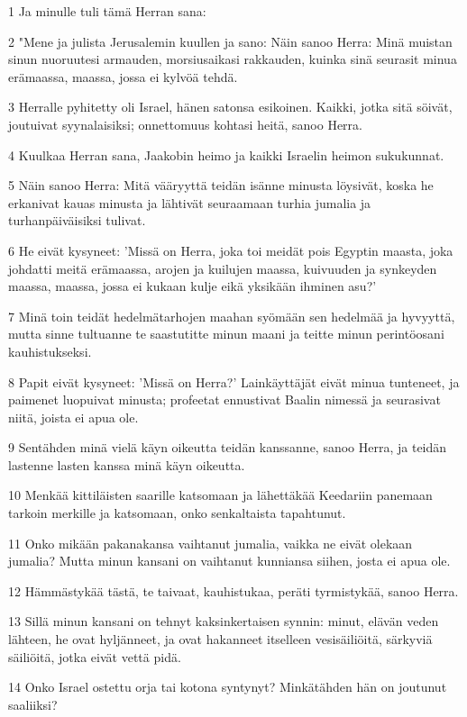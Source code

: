 \par 1 Ja minulle tuli tämä Herran sana:
\par 2 "Mene ja julista Jerusalemin kuullen ja sano: Näin sanoo Herra: Minä muistan sinun nuoruutesi armauden, morsiusaikasi rakkauden, kuinka sinä seurasit minua erämaassa, maassa, jossa ei kylvöä tehdä.
\par 3 Herralle pyhitetty oli Israel, hänen satonsa esikoinen. Kaikki, jotka sitä söivät, joutuivat syynalaisiksi; onnettomuus kohtasi heitä, sanoo Herra.
\par 4 Kuulkaa Herran sana, Jaakobin heimo ja kaikki Israelin heimon sukukunnat.
\par 5 Näin sanoo Herra: Mitä vääryyttä teidän isänne minusta löysivät, koska he erkanivat kauas minusta ja lähtivät seuraamaan turhia jumalia ja turhanpäiväisiksi tulivat.
\par 6 He eivät kysyneet: 'Missä on Herra, joka toi meidät pois Egyptin maasta, joka johdatti meitä erämaassa, arojen ja kuilujen maassa, kuivuuden ja synkeyden maassa, maassa, jossa ei kukaan kulje eikä yksikään ihminen asu?'
\par 7 Minä toin teidät hedelmätarhojen maahan syömään sen hedelmää ja hyvyyttä, mutta sinne tultuanne te saastutitte minun maani ja teitte minun perintöosani kauhistukseksi.
\par 8 Papit eivät kysyneet: 'Missä on Herra?' Lainkäyttäjät eivät minua tunteneet, ja paimenet luopuivat minusta; profeetat ennustivat Baalin nimessä ja seurasivat niitä, joista ei apua ole.
\par 9 Sentähden minä vielä käyn oikeutta teidän kanssanne, sanoo Herra, ja teidän lastenne lasten kanssa minä käyn oikeutta.
\par 10 Menkää kittiläisten saarille katsomaan ja lähettäkää Keedariin panemaan tarkoin merkille ja katsomaan, onko senkaltaista tapahtunut.
\par 11 Onko mikään pakanakansa vaihtanut jumalia, vaikka ne eivät olekaan jumalia? Mutta minun kansani on vaihtanut kunniansa siihen, josta ei apua ole.
\par 12 Hämmästykää tästä, te taivaat, kauhistukaa, peräti tyrmistykää, sanoo Herra.
\par 13 Sillä minun kansani on tehnyt kaksinkertaisen synnin: minut, elävän veden lähteen, he ovat hyljänneet, ja ovat hakanneet itselleen vesisäiliöitä, särkyviä säiliöitä, jotka eivät vettä pidä.
\par 14 Onko Israel ostettu orja tai kotona syntynyt? Minkätähden hän on joutunut saaliiksi?
